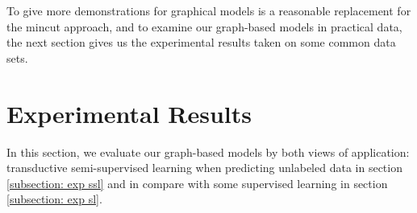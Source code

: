 \begin{table}[ht!]
	\centering
	\captionsetup{justification=centering}
	\caption{Measurement of inferences on $\mathcal{N}(0, 0.8^2)$ and $\mathcal{N}(1, 0.8^2)$.}
	\label{table4: synthetic normal 2}
\end{table}

To give more demonstrations for graphical models is a reasonable replacement for the mincut approach, and to examine our graph-based models in practical data, the next section gives us the experimental results taken on some common data sets.

\section{Experimental Results}
In this section, we evaluate our graph-based models by both views of application: transductive semi-supervised learning when predicting unlabeled data in section \ref{subsection: exp ssl} and in compare with some supervised learning in section \ref{subsection: exp sl}. 

